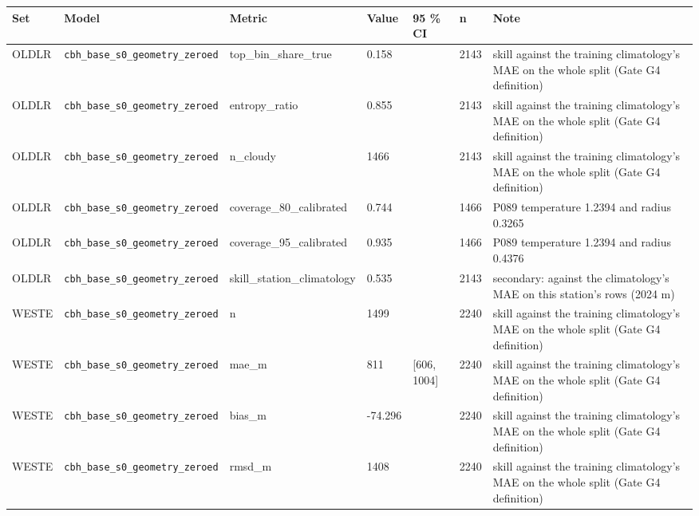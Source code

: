 \begin{center}{\scriptsize\setlength{\tabcolsep}{3pt}
\begin{tabular}{lp{2.4cm}llllp{7.3cm}}
\toprule
Set & Model & Metric & Value & 95 \% CI & n & Note \\
\midrule
OLDLR & \texttt{cbh\_\allowbreak{}base\_\allowbreak{}s0\_\allowbreak{}geometry\_\allowbreak{}zeroed} & top\_bin\_share\_true & 0.158 &  & 2143 & skill against the training climatology's MAE on the whole split (Gate G4 definition) \\
OLDLR & \texttt{cbh\_\allowbreak{}base\_\allowbreak{}s0\_\allowbreak{}geometry\_\allowbreak{}zeroed} & entropy\_ratio & 0.855 &  & 2143 & skill against the training climatology's MAE on the whole split (Gate G4 definition) \\
OLDLR & \texttt{cbh\_\allowbreak{}base\_\allowbreak{}s0\_\allowbreak{}geometry\_\allowbreak{}zeroed} & n\_cloudy & 1466 &  & 2143 & skill against the training climatology's MAE on the whole split (Gate G4 definition) \\
OLDLR & \texttt{cbh\_\allowbreak{}base\_\allowbreak{}s0\_\allowbreak{}geometry\_\allowbreak{}zeroed} & coverage\_80\_calibrated & 0.744 &  & 1466 & P089 temperature 1.2394 and radius 0.3265 \\
OLDLR & \texttt{cbh\_\allowbreak{}base\_\allowbreak{}s0\_\allowbreak{}geometry\_\allowbreak{}zeroed} & coverage\_95\_calibrated & 0.935 &  & 1466 & P089 temperature 1.2394 and radius 0.4376 \\
OLDLR & \texttt{cbh\_\allowbreak{}base\_\allowbreak{}s0\_\allowbreak{}geometry\_\allowbreak{}zeroed} & skill\_station\_climatology & 0.535 &  & 2143 & secondary: against the climatology's MAE on this station's rows (2024 m) \\
WESTE & \texttt{cbh\_\allowbreak{}base\_\allowbreak{}s0\_\allowbreak{}geometry\_\allowbreak{}zeroed} & n & 1499 &  & 2240 & skill against the training climatology's MAE on the whole split (Gate G4 definition) \\
WESTE & \texttt{cbh\_\allowbreak{}base\_\allowbreak{}s0\_\allowbreak{}geometry\_\allowbreak{}zeroed} & mae\_m & 811 & [606, 1004] & 2240 & skill against the training climatology's MAE on the whole split (Gate G4 definition) \\
WESTE & \texttt{cbh\_\allowbreak{}base\_\allowbreak{}s0\_\allowbreak{}geometry\_\allowbreak{}zeroed} & bias\_m & -74.296 &  & 2240 & skill against the training climatology's MAE on the whole split (Gate G4 definition) \\
WESTE & \texttt{cbh\_\allowbreak{}base\_\allowbreak{}s0\_\allowbreak{}geometry\_\allowbreak{}zeroed} & rmsd\_m & 1408 &  & 2240 & skill against the training climatology's MAE on the whole split (Gate G4 definition) \\

\end{tabular}}
\end{center}
